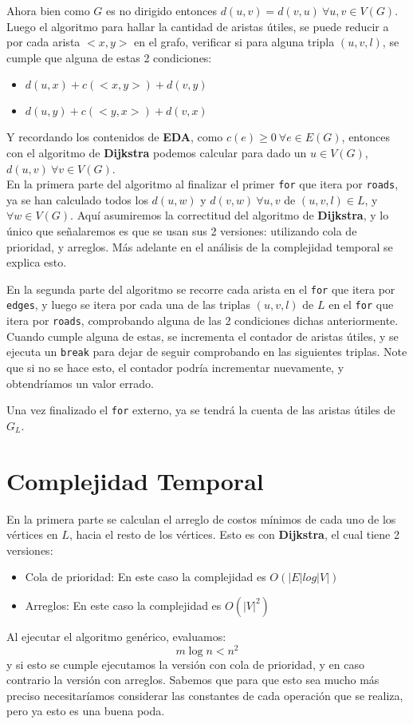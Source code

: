 \documentclass[a4paper]{article}
\begin{document}
	
	Ahora bien como $G$ es no dirigido entonces $d(u,v) = d(v,u) ~ \forall u,v\in V(G)$.\\
	
	Luego el algoritmo para hallar la cantidad de aristas útiles, se puede reducir a por cada arista $<x,y>$ en el grafo, verificar si para alguna tripla $(u,v,l)$, se cumple que alguna de estas 2 condiciones:	
	\begin{itemize}
		\item $d(u,x) + c(<x,y>) + d(v, y)$
		\item $d(u,y) + c(<y,x>) + d(v, x)$
	\end{itemize}

	Y recordando los contenidos de \textbf{EDA}, como $c(e) \ge 0 ~ \forall e \in E(G)$, entonces con el algoritmo de \textbf{Dijkstra} podemos calcular para dado un $u\in V(G)$, $d(u,v) ~ \forall v \in V(G)$.\\
   
	
	En la primera parte del algoritmo al finalizar el primer \texttt{for} que itera por \texttt{roads}, ya se han calculado todos los $d(u, w)$ y $d(v, w) ~ \forall u,v$ de $(u,v,l) \in L$, y $\forall w \in V(G)$. Aquí asumiremos la correctitud del algoritmo de \textbf{Dijkstra}, y lo único que señalaremos es que se usan sus 2 versiones: utilizando cola de prioridad, y arreglos. Más adelante en el análisis de la complejidad temporal se explica esto.
	
	En la segunda parte del algoritmo se recorre cada arista en el \texttt{for} que itera por \texttt{edges}, y luego se itera por cada una de las triplas $(u,v,l)$ de $L$ en el \texttt{for} que itera por \texttt{roads}, comprobando alguna de las 2 condiciones dichas anteriormente. Cuando cumple alguna de estas, se incrementa el contador de aristas útiles, y se ejecuta un \texttt{break} para dejar de seguir comprobando en las siguientes triplas. Note que si no se hace esto, el contador podría incrementar nuevamente, y obtendríamos un valor errado.
	
	Una vez finalizado el \texttt{for} externo, ya se tendrá la cuenta de las aristas útiles de $G_L$.
	

	\section*{Complejidad Temporal}
	
	En la primera parte se calculan el arreglo de costos mínimos de cada uno de los vértices en $L$, hacia el resto de los vértices. Esto es con \textbf{Dijkstra}, el cual tiene 2 versiones:
	\begin{itemize}
		\item Cola de prioridad: En este caso la complejidad es $O(|E|log|V|)$
		\item Arreglos: En este caso la complejidad es $O(|V|^2)$
	\end{itemize}
	Al ejecutar el algoritmo genérico, evaluamos:
	$$ m\log n < n^2$$
	y si esto se cumple ejecutamos la versión con cola de prioridad, y en caso contrario la versión con arreglos. Sabemos que para que esto sea mucho más preciso necesitaríamos considerar las constantes de cada operación que se realiza, pero ya esto es una buena poda.
	
\end{document}
